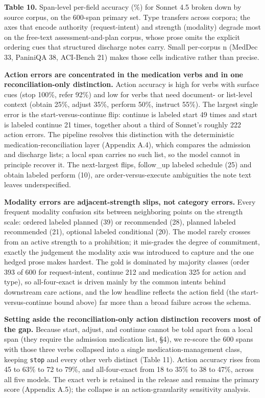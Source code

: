 \textbf{Table 10.} Span-level per-field accuracy (\%) for Sonnet 4.5 broken down by source corpus, on the 600-span primary set. Type transfers across corpora; the axes that encode authority (request-intent) and strength (modality) degrade most on the free-text assessment-and-plan corpus, whose prose omits the explicit ordering cues that structured discharge notes carry. Small per-corpus n (MedDec 33, PaniniQA 38, ACI-Bench 21) makes those cells indicative rather than precise.

\textbf{Action errors are concentrated in the medication verbs and in one reconciliation-only distinction.} Action accuracy is high for verbs with surface cues (stop 100\%, refer 92\%) and low for verbs that need document- or list-level context (obtain 25\%, adjust 35\%, perform 50\%, instruct 55\%). The largest single error is the start-versus-continue flip: continue is labeled start 49 times and start is labeled continue 21 times, together about a third of Sonnet's roughly 222 action errors. The pipeline resolves this distinction with the deterministic medication-reconciliation layer (Appendix A.4), which compares the admission and discharge lists; a local span carries no such list, so the model cannot in principle recover it. The next-largest flips, follow\_up labeled schedule (25) and obtain labeled perform (10), are order-versus-execute ambiguities the note text leaves underspecified.

\textbf{Modality errors are adjacent-strength slips, not category errors.} Every frequent modality confusion sits between neighboring points on the strength scale: ordered labeled planned (39) or recommended (28), planned labeled recommended (21), optional labeled conditional (20). The model rarely crosses from an active strength to a prohibition; it mis-grades the degree of commitment, exactly the judgement the modality axis was introduced to capture and the one hedged prose makes hardest. The gold is dominated by majority classes (order 393 of 600 for request-intent, continue 212 and medication 325 for action and type), so all-four-exact is driven mainly by the common intents behind downstream care actions, and the low headline reflects the action field (the start-versus-continue bound above) far more than a broad failure across the schema.

\textbf{Setting aside the reconciliation-only action distinction recovers most of the gap.} Because start, adjust, and continue cannot be told apart from a local span (they require the admission medication list, §4), we re-score the 600 spans with those three verbs collapsed into a single medication-management class, keeping \texttt{stop} and every other verb distinct (Table 11). Action accuracy rises from 45 to 63\% to 72 to 79\%, and all-four-exact from 18 to 35\% to 38 to 47\%, across all five models. The exact verb is retained in the release and remains the primary score (Appendix A.5); the collapse is an action-granularity sensitivity analysis.

